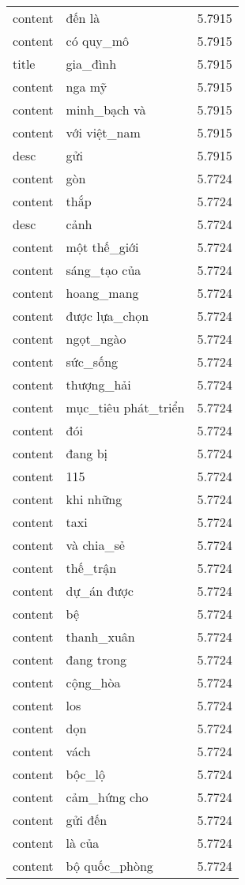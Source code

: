 \documentclass{article}
\begin{document}
\begin{tabular}{lll}
content & đến là & 5.7915\\
content & có quy\_mô & 5.7915\\
title & gia\_đình & 5.7915\\
content & nga mỹ & 5.7915\\
content & minh\_bạch và & 5.7915\\
content & với việt\_nam & 5.7915\\
desc & gửi & 5.7915\\
content & gòn & 5.7724\\
content & thắp & 5.7724\\
desc & cảnh & 5.7724\\
content & một thế\_giới & 5.7724\\
content & sáng\_tạo của & 5.7724\\
content & hoang\_mang & 5.7724\\
content & được lựa\_chọn & 5.7724\\
content & ngọt\_ngào & 5.7724\\
content & sức\_sống & 5.7724\\
content & thượng\_hải & 5.7724\\
content & mục\_tiêu phát\_triển & 5.7724\\
content & đói & 5.7724\\
content & đang bị & 5.7724\\
content & 115 & 5.7724\\
content & khi những & 5.7724\\
content & taxi & 5.7724\\
content & và chia\_sẻ & 5.7724\\
content & thế\_trận & 5.7724\\
content & dự\_án được & 5.7724\\
content & bệ & 5.7724\\
content & thanh\_xuân & 5.7724\\
content & đang trong & 5.7724\\
content & cộng\_hòa & 5.7724\\
content & los & 5.7724\\
content & dọn & 5.7724\\
content & vách & 5.7724\\
content & bộc\_lộ & 5.7724\\
content & cảm\_hứng cho & 5.7724\\
content & gửi đến & 5.7724\\
content & là của & 5.7724\\
content & bộ quốc\_phòng & 5.7724\\

\end{tabular}
\end{document}
